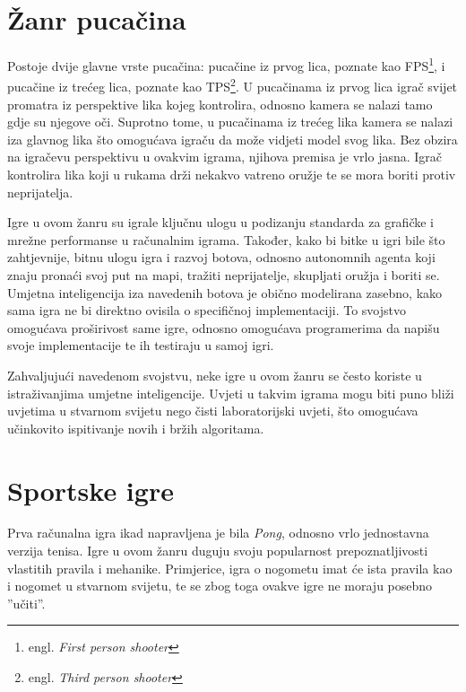 \documentclass[times, utf8, zavrsni, numeric]{fer}
\begin{document}
\section{Žanr pucačina}

\par Postoje dvije glavne vrste pucačina: pucačine iz prvog lica, poznate kao FPS\footnote{engl. \textit{First person shooter}}, i pucačine iz trećeg lica, poznate kao TPS\footnote{engl. \textit{Third person shooter}}.
U pucačinama iz prvog lica igrač svijet promatra iz perspektive lika kojeg kontrolira, odnosno kamera se nalazi tamo gdje su njegove oči.
Suprotno tome, u pucačinama iz trećeg lika kamera se nalazi iza glavnog lika što omogućava igraču da može vidjeti model svog lika.
Bez obzira na igračevu perspektivu u ovakvim igrama, njihova premisa je vrlo jasna.
Igrač kontrolira lika koji u rukama drži nekakvo vatreno oružje te se mora boriti protiv neprijatelja.

\par Igre u ovom žanru su igrale ključnu ulogu u podizanju standarda za grafičke i mrežne performanse u računalnim igrama.
Također, kako bi bitke u igri bile što zahtjevnije, bitnu ulogu igra i razvoj botova, odnosno autonomnih agenta koji znaju pronaći svoj put na mapi, tražiti neprijatelje, skupljati oružja i boriti se.
Umjetna inteligencija iza navedenih botova je obično modelirana zasebno, kako sama igra ne bi direktno ovisila o specifičnoj implementaciji.
To svojstvo omogućava proširivost same igre, odnosno omogućava programerima da napišu svoje implementacije te ih testiraju u samoj igri.

\par Zahvaljujući navedenom svojstvu, neke igre u ovom žanru se često koriste u istraživanjima umjetne inteligencije.
Uvjeti u takvim igrama mogu biti puno bliži uvjetima u stvarnom svijetu nego čisti laboratorijski uvjeti, što omogućava učinkovito ispitivanje novih i bržih algoritama.

\section{Sportske igre}

\par Prva računalna igra ikad napravljena je bila \textit{Pong}, odnosno vrlo jednostavna verzija tenisa.
Igre u ovom žanru duguju svoju popularnost prepoznatljivosti vlastitih pravila i mehanike.
Primjerice, igra o nogometu imat će ista pravila kao i nogomet u stvarnom svijetu, te se zbog toga ovakve igre ne moraju posebno ''učiti''.
\end{document}
